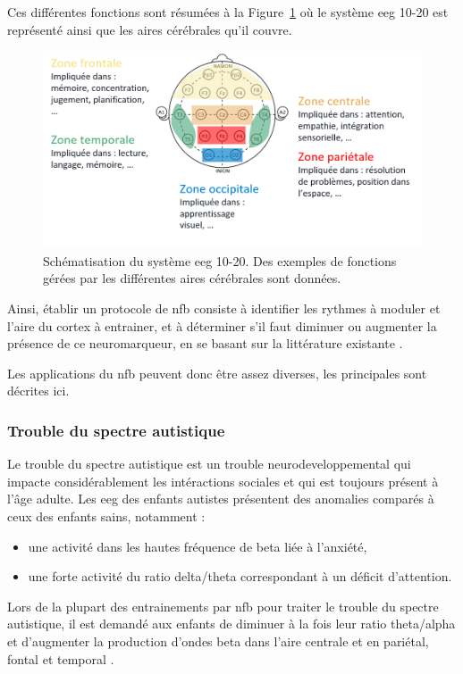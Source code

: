 Ces différentes fonctions sont résumées à la Figure~\ref{Figure:introduction_cortical_areas_and_functions} où le système \gls{eeg} 10-20 est représenté ainsi
que les aires cérébrales qu'il couvre.

\begin{figure}[h!]
  \centering
	\includegraphics[width=1\linewidth]{figures/chapter-1/introduction_cortical_areas_and_functions} 
  \caption{Schématisation du système \gls{eeg} 10-20. Des exemples de fonctions gérées par les différentes aires cérébrales sont données. }
  \label{Figure:introduction_cortical_areas_and_functions}
\end{figure}

Ainsi, établir un protocole de \gls{nfb} consiste à identifier les rythmes à moduler et l'aire 
du cortex à entrainer, et à déterminer s'il faut diminuer ou augmenter la présence de ce neuromarqueur, en se basant sur la littérature 
existante \citep{Micoulaud2019}.

Les applications du \gls{nfb} peuvent donc être assez diverses, les principales sont décrites ici. 

\subsubsection{Trouble du spectre autistique}

Le trouble du spectre autistique est un trouble neurodeveloppemental qui impacte considérablement les intéractions sociales et qui est toujours présent à 
l'âge adulte. Les \gls{eeg} des enfants autistes présentent des anomalies comparés à ceux des enfants sains, notamment \citep{Coben2010, Kouijzer2010} :
\begin{itemize}
\item une activité dans les hautes fréquence de beta liée à l'anxiété,
\item une forte activité du ratio delta/theta correspondant à un déficit d'attention.
\end{itemize}
Lors de la plupart des entrainements par \gls{nfb} pour traiter le trouble du spectre autistique, il est demandé aux enfants de diminuer à la fois leur ratio 
theta/alpha et d'augmenter la production d'ondes beta dans l'aire centrale \citep{Thompson2010} et en pariétal, fontal et temporal \citep{Othmer2007}. 

